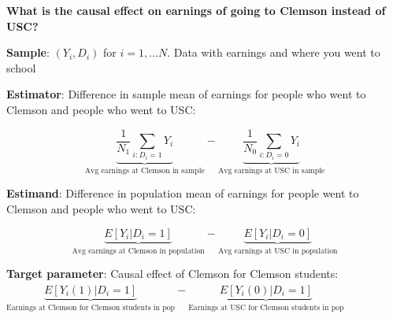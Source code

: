 \documentclass[11pt, aspectratio=169]{beamer}
\newenvironment{wideitemize}{\itemize\addtolength{\itemsep}{5pt}}{\enditemize}
\begin{document}
\begin{frame}{\bf \large What is the causal effect on earnings of going to Clemson instead of USC?}
	\begin{wideitemize}
		\item
		\textbf{Sample}: $(Y_i,D_i)$ for $i=1,...N$. Data with earnings and where you went to school
		
		\pause 
		
		\item
		\textbf{Estimator}: Difference in sample mean of earnings for people who went to Clemson and people who went to USC: 
		
		$$ \underbrace{\frac{1}{N_1} \sum_{i:D_i=1} Y_i}_{\text{Avg earnings at Clemson in sample}} - \underbrace{\frac{1}{N_0} \sum_{i:D_i=0} Y_i}_{\text{Avg earnings at USC in sample}}$$		
		
		
		\pause
		\item
		\textbf{Estimand}: 
		Difference in population mean of earnings for people went to Clemson and people who went to USC: 
		
		$$\underbrace{ E[ Y_i | D_i = 1] }_{\text{Avg earnings at Clemson in population}} - \underbrace{E[Y_i | D_i = 0]}_{\text{Avg earnings at USC in population}}$$
		
		\pause 
		
		\item \textbf{Target parameter}: Causal effect of Clemson for Clemson students:
		$\underbrace{E[Y_i(1) | D_i =1]}_{\text{Earnings at Clemson for Clemson students in pop}} - \underbrace{E[Y_i(0) | D_i = 1]}_{\text{Earnings at USC for Clemson students in pop}} $ 
	\end{wideitemize}
\end{frame}
\end{document}
